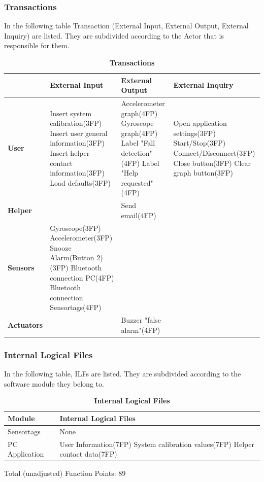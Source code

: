 \documentclass[conference,12pt]{IEEETran}
\begin{document}
    \subsubsection{Transactions}
    In the following table Transaction (External Input, External Output, External Inquiry) are listed.
    They are subdivided according to the Actor that is responsible for them.\\    
    
    \begin{table}[h]
    	\centering
    	\caption{\textbf{Transactions}}
    	{\renewcommand{\arraystretch}{2}%
    	\begin{tabular}{|l|p{2cm}|p{2cm}|p{2cm}|}
    		\hline
    		& \textbf{External Input} & \textbf{External Output} & \textbf{External Inquiry} \\
    		\hline
    		\textbf{User} & Insert system calibration(3FP) 
    		Insert user general information(3FP) 
    		Insert helper contact information(3FP) 
    		Load defaults(3FP) & 
    		Accelerometer graph(4FP) 
    		Gyroscope graph(4FP) 
    		Label "Fall detection"(4FP) 
    		Label "Help requested"(4FP) & 
    		Open application settings(3FP) 
    		Start/Stop(3FP) 
    		Connect/Disconnect(3FP) 
    		Close button(3FP) 
    		Clear	graph button(3FP) \\
    		\hline
    		\textbf{Helper} & & Send email(4FP) & \\
    		\hline
    		\textbf{Sensors} & Gyroscope(3FP) 
    		Accelerometer(3FP) 
    		Snooze Alarm(Button 2)(3FP) 
    		Bluetooth connection PC(4FP) 
    		Bluetooth connection Sensortags(4FP) 
    		& & \\
    		\hline
    		\textbf{Actuators} & & Buzzer "false alarm"(4FP) & \\
    		\hline
    	\end{tabular}}
    \end{table}

\subsubsection{Internal Logical Files}
In the following table, ILFs are listed. They are subdivided according to the software module they belong to.

\begin{table}[h]
	\centering
	\caption{\textbf{Internal Logical Files}}
	{\renewcommand{\arraystretch}{2}%
		\begin{tabular}{|l|p{2cm}|}
			\hline
			\textbf{Module} & \textbf{Internal Logical Files} \\
			\hline
			Sensortags & None \\
			\hline
			PC Application & User Information(7FP) 
			System calibration values(7FP) 
			Helper contact data(7FP) \\
			\hline
	\end{tabular}}
\end{table}
Total (unadjusted) Function Points: 89
\vskip 0.5cm
\end{document}
